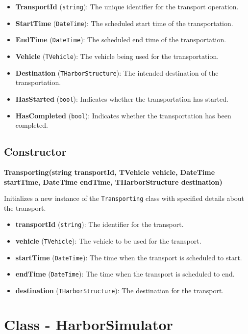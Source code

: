 \documentclass[12pt]{article}
\begin{document}
\begin{itemize}
    \item \textbf{TransportId} (\texttt{string}): The unique identifier for the transport operation.
    \item \textbf{StartTime} (\texttt{DateTime}): The scheduled start time of the transportation.
    \item \textbf{EndTime} (\texttt{DateTime}): The scheduled end time of the transportation.
    \item \textbf{Vehicle} (\texttt{TVehicle}): The vehicle being used for the transportation.
    \item \textbf{Destination} (\texttt{THarborStructure}): The intended destination of the transportation.
    \item \textbf{HasStarted} (\texttt{bool}): Indicates whether the transportation has started.
    \item \textbf{HasCompleted} (\texttt{bool}): Indicates whether the transportation has been completed.
\end{itemize}

\subsection*{Constructor}

\textbf{Transporting(string transportId, TVehicle vehicle, DateTime startTime, DateTime endTime, THarborStructure destination)}

Initializes a new instance of the \texttt{Transporting} class with specified details about the transport.

\begin{itemize}
    \item \textbf{transportId} (\texttt{string}): The identifier for the transport.
    \item \textbf{vehicle} (\texttt{TVehicle}): The vehicle to be used for the transport.
    \item \textbf{startTime} (\texttt{DateTime}): The time when the transport is scheduled to start.
    \item \textbf{endTime} (\texttt{DateTime}): The time when the transport is scheduled to end.
    \item \textbf{destination} (\texttt{THarborStructure}): The destination for the transport.
\end{itemize}

\newpage
\section*{Class - HarborSimulator}
\end{document}
